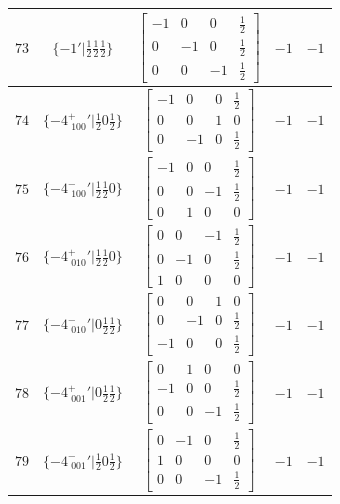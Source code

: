 \documentclass[fleqn,8pt]{jsarticle}
\begin{document}
\begin{longtable}{ccccc}
$ 73 $ & $ \{-1{}'|\frac{1}{2} \frac{1}{2} \frac{1}{2}\} $ & $ \begin{bmatrix} -1 & 0 & 0 & \frac{1}{2} \\ 0 & -1 & 0 & \frac{1}{2} \\ 0 & 0 & -1 & \frac{1}{2} \end{bmatrix} $ & $ -1 $ & $ -1 $ \\ \hline
$ 74 $ & $ \{-4^{+}_{\,\,100}{}'|\frac{1}{2} 0 \frac{1}{2}\} $ & $ \begin{bmatrix} -1 & 0 & 0 & \frac{1}{2} \\ 0 & 0 & 1 & 0 \\ 0 & -1 & 0 & \frac{1}{2} \end{bmatrix} $ & $ -1 $ & $ -1 $ \\ \hline
$ 75 $ & $ \{-4^{-}_{\,\,100}{}'|\frac{1}{2} \frac{1}{2} 0\} $ & $ \begin{bmatrix} -1 & 0 & 0 & \frac{1}{2} \\ 0 & 0 & -1 & \frac{1}{2} \\ 0 & 1 & 0 & 0 \end{bmatrix} $ & $ -1 $ & $ -1 $ \\ \hline
$ 76 $ & $ \{-4^{+}_{\,\,010}{}'|\frac{1}{2} \frac{1}{2} 0\} $ & $ \begin{bmatrix} 0 & 0 & -1 & \frac{1}{2} \\ 0 & -1 & 0 & \frac{1}{2} \\ 1 & 0 & 0 & 0 \end{bmatrix} $ & $ -1 $ & $ -1 $ \\ \hline
$ 77 $ & $ \{-4^{-}_{\,\,010}{}'|0 \frac{1}{2} \frac{1}{2}\} $ & $ \begin{bmatrix} 0 & 0 & 1 & 0 \\ 0 & -1 & 0 & \frac{1}{2} \\ -1 & 0 & 0 & \frac{1}{2} \end{bmatrix} $ & $ -1 $ & $ -1 $ \\ \hline
$ 78 $ & $ \{-4^{+}_{\,\,001}{}'|0 \frac{1}{2} \frac{1}{2}\} $ & $ \begin{bmatrix} 0 & 1 & 0 & 0 \\ -1 & 0 & 0 & \frac{1}{2} \\ 0 & 0 & -1 & \frac{1}{2} \end{bmatrix} $ & $ -1 $ & $ -1 $ \\ \hline
$ 79 $ & $ \{-4^{-}_{\,\,001}{}'|\frac{1}{2} 0 \frac{1}{2}\} $ & $ \begin{bmatrix} 0 & -1 & 0 & \frac{1}{2} \\ 1 & 0 & 0 & 0 \\ 0 & 0 & -1 & \frac{1}{2} \end{bmatrix} $ & $ -1 $ & $ -1 $ \\ \hline

\end{longtable}
\end{document}
